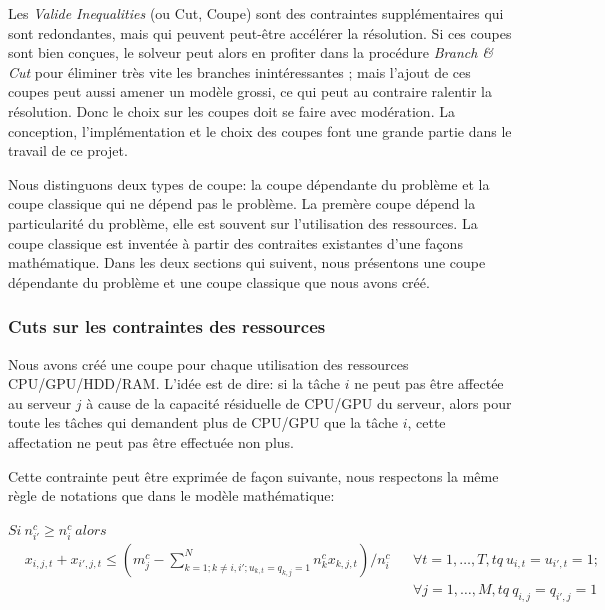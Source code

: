 Les \textit{Valide Inequalities} (ou Cut, Coupe) sont des contraintes supplémentaires qui sont redondantes, mais qui peuvent peut-être accélérer la résolution. Si ces coupes sont bien conçues, le solveur peut alors en profiter dans la procédure \textit{Branch \& Cut} pour éliminer très vite les branches inintéressantes ; mais l'ajout de ces coupes peut aussi amener un modèle grossi, ce qui peut au contraire ralentir la résolution. Donc le choix sur les coupes doit se faire avec modération. La conception, l'implémentation et le choix des coupes font une grande partie dans le travail de ce projet.

Nous distinguons deux types de coupe: la coupe dépendante du problème et la coupe classique qui ne dépend pas le problème. La premère coupe dépend la particularité du problème, elle est souvent sur l'utilisation des ressources. La coupe classique est inventée à partir des contraites existantes d'une façons mathématique. Dans les deux sections qui suivent, nous présentons une coupe dépendante du problème et une coupe classique que nous avons créé.

\subsubsection{Cuts sur les contraintes des ressources}\label{cut1}
Nous avons créé une coupe pour chaque utilisation des ressources CPU/GPU/HDD/RAM. L'idée est de dire: si la tâche $i$ ne peut pas être affectée au serveur $j$ à cause de la capacité résiduelle de CPU/GPU du serveur, alors pour toute les tâches qui demandent plus de CPU/GPU que la tâche $i$, cette affectation ne peut pas être effectuée non plus.


Cette contrainte peut être exprimée de façon suivante, nous respectons la même règle de notations que dans le modèle mathématique:
\bigskip

$Si \  n^c_{i\prime}\geq n^c_{i}\ alors\;$
\begin{align} 
&x_{i,j,t}+x_{i\prime,j,t}\leq (m^c_j-\sum^N_{k=1; k\neq{i},i\prime;u_{k,t}=q_{k,j}=1}{n^c_kx_{k,j,t}})/n^c_i
&&\forall t=1,\ldots,T, tq\ u_{i,t}=u_{i\prime,t}=1; \nonumber \\
 & &&\forall j=1, \ldots, M, tq\ q_{i,j}=q_{i\prime,j}=1
\end{align} 
 
